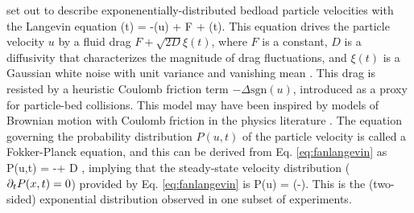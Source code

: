 \citet{Fan2014} set out to describe exponenentially-distributed bedload particle velocities with the Langevin equation
\be {}(t) = -\Delta {}(u) + F + \xi(t). \label{eq:fanlangevin}\ee
This equation drives the particle velocity $u$ by a fluid drag $F + \sqrt{2D} \xi(t)$, where $F$ is a constant, $D$ is a diffusivity that characterizes the magnitude of drag fluctuations, and $\xi(t)$ is a Gaussian white noise with unit variance and vanishing mean \citep{Gardiner1983}.
This drag is resisted by a heuristic Coulomb friction term $-\Delta \text{sgn}(u)$, introduced as a proxy for particle-bed collisions. This model may have been inspired by models of Brownian motion with Coulomb friction in the physics literature \citep[e.g.][]{DeGennes2005,Touchette2010,Menzel2011}.
The equation governing the probability distribution $P(u,t)$ of the particle velocity is called a Fokker-Planck equation, and this can be derived from Eq. \ref{eq:fanlangevin} as \citep{Risken1989,VanKampen2007} 
\be {} P(u,t) = -\Delta{} + D ,\ee
implying that the steady-state velocity distribution ($\partial_t P(x,t) = 0$) provided by Eq. \ref{eq:fanlangevin} is
\be P(u) = \exp\Big(-\Big).\ee
This is the (two-sided) exponential distribution observed in one subset of experiments.

